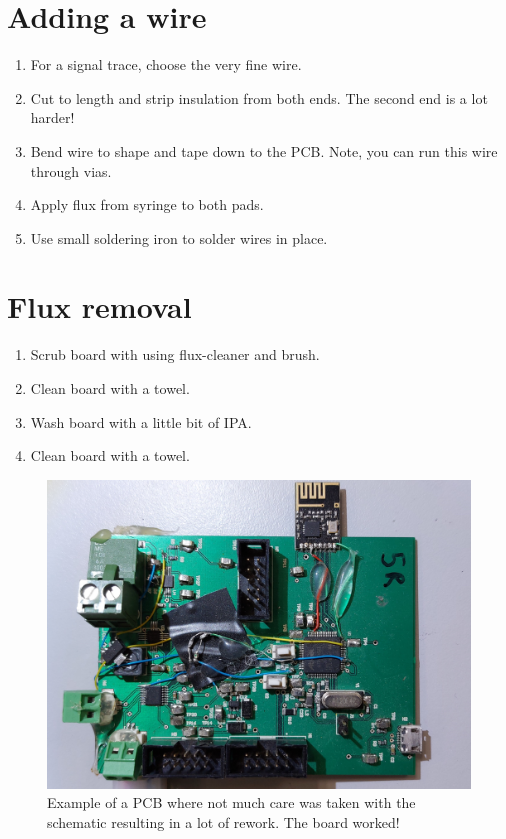 \section{Adding a wire}

\begin{enumerate}
\item For a signal trace, choose the very fine wire.

\item Cut to length and strip insulation from both ends.  The second
  end is a lot harder!

\item Bend wire to shape and tape down to the PCB.  Note, you can run
  this wire through vias.

\item Apply flux from syringe to both pads.

\item Use small soldering iron to solder wires in place.
\end{enumerate}


\section{Flux removal}

\begin{enumerate}
\item Scrub board with using flux-cleaner and brush.
\item Clean board with a towel.
\item Wash board with a little bit of IPA.
\item Clean board with a towel.
\end{enumerate}




\begin{figure}[!h]
  \centering \includegraphics[width=6in]{figs/rework2.jpg}
  \caption{Example of a PCB where not much care was taken with the
    schematic resulting in a lot of rework. The board worked!}
  \label{fig:rework2}
\end{figure}
